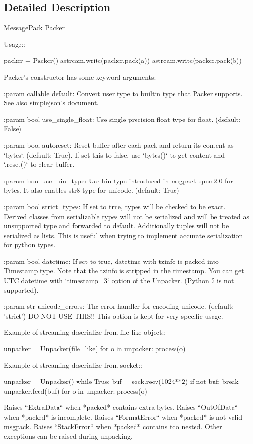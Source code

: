 \subsection{Detailed Description}
\begin{DoxyVerb}MessagePack Packer

Usage::

    packer = Packer()
    astream.write(packer.pack(a))
    astream.write(packer.pack(b))

Packer's constructor has some keyword arguments:

:param callable default:
    Convert user type to builtin type that Packer supports.
    See also simplejson's document.

:param bool use_single_float:
    Use single precision float type for float. (default: False)

:param bool autoreset:
    Reset buffer after each pack and return its content as `bytes`. (default: True).
    If set this to false, use `bytes()` to get content and `.reset()` to clear buffer.

:param bool use_bin_type:
    Use bin type introduced in msgpack spec 2.0 for bytes.
    It also enables str8 type for unicode. (default: True)

:param bool strict_types:
    If set to true, types will be checked to be exact. Derived classes
    from serializable types will not be serialized and will be
    treated as unsupported type and forwarded to default.
    Additionally tuples will not be serialized as lists.
    This is useful when trying to implement accurate serialization
    for python types.

:param bool datetime:
    If set to true, datetime with tzinfo is packed into Timestamp type.
    Note that the tzinfo is stripped in the timestamp.
    You can get UTC datetime with `timestamp=3` option of the Unpacker.
    (Python 2 is not supported).

:param str unicode_errors:
    The error handler for encoding unicode. (default: 'strict')
    DO NOT USE THIS!!  This option is kept for very specific usage.

Example of streaming deserialize from file-like object::

    unpacker = Unpacker(file_like)
    for o in unpacker:
        process(o)

Example of streaming deserialize from socket::

    unpacker = Unpacker()
    while True:
        buf = sock.recv(1024**2)
        if not buf:
            break
        unpacker.feed(buf)
        for o in unpacker:
            process(o)

Raises ``ExtraData`` when *packed* contains extra bytes.
Raises ``OutOfData`` when *packed* is incomplete.
Raises ``FormatError`` when *packed* is not valid msgpack.
Raises ``StackError`` when *packed* contains too nested.
Other exceptions can be raised during unpacking.
\end{DoxyVerb}
 

